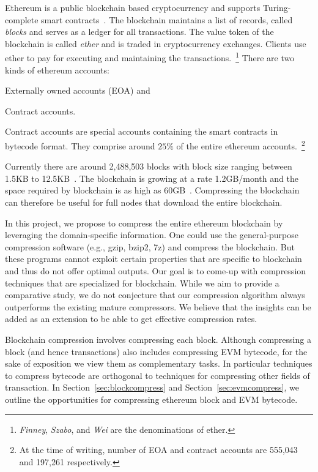 
Ethereum is a public blockchain based cryptocurrency and supports Turing-complete smart contracts~\cite{ethereum}.
The blockchain maintains a list of records, called \emph{blocks} and serves as a ledger for all transactions.
The value token of the blockchain is called \emph{ether} and 
is traded in cryptocurrency exchanges.
Clients use ether to pay for executing and maintaining the transactions.~\footnote{
\emph{Finney}, \emph{Szabo}, and \emph{Wei} are the denominations of ether.}
There are two kinds of ethereum accounts: 
\begin{enumerate*}
	\item Externally owned accounts (EOA) and
	\item Contract accounts.
\end{enumerate*}
Contract accounts are special accounts containing the smart contracts in bytecode format. They comprise around $25\%$ of the entire ethereum accounts.~\footnote{
At the time of writing, number of EOA and contract accounts are 555,043 and 197,261 respectively.}  
 
Currently there are around 2,488,503 blocks with block size ranging between 1.5KB to 12.5KB~\cite{ethblocksize}.  
The blockchain is growing at a rate 1.2GB/month and
the space required by blockchain is as high as 60GB~\cite{ethdiskspace}.
Compressing the blockchain can therefore be useful for full nodes that download the entire blockchain.

In this project, we propose to compress the entire ethereum blockchain by leveraging the domain-specific information.
One could use the general-purpose compression software (e.g., gzip, bzip2, 7z) and compress the blockchain.
But these programs cannot exploit certain properties that are specific to blockchain and thus do not offer optimal outputs.
Our goal is to come-up with compression techniques that  are specialized for blockchain.
While we aim to provide a comparative study, we do not conjecture that our compression algorithm always outperforms the existing mature compressors.
We believe that the insights can be added as an extension to be able to get effective compression rates.   

Blockchain compression involves compressing each block.
Although compressing a block (and hence transactions) also includes compressing EVM bytecode, 
for the sake of exposition we view them as complementary tasks. 
In particular techniques to compress bytecode are orthogonal to techniques for compressing other fields of transaction.
In Section~\ref{sec:blockcompress} and 
Section~\ref{sec:evmcompress}, we   
outline the opportunities for compressing ethereum block and EVM bytecode. 

